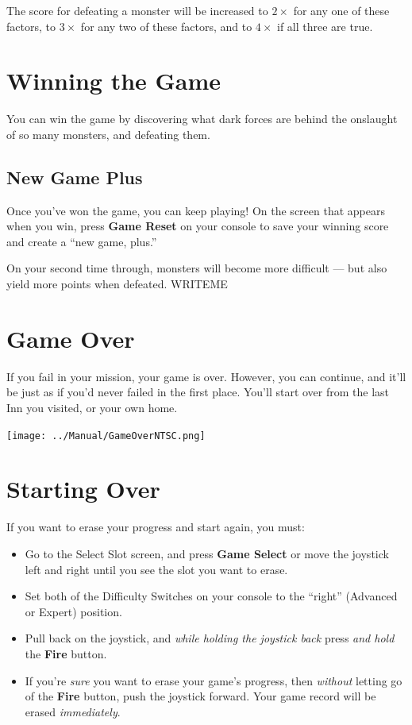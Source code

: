\documentclass[10pt,twocolumn,openany,article]{memoir}
\begin{document}
The score for  defeating a monster will be increased  to $2\times$ for any
one of these  factors, to $3\times$ for  any two of these  factors, and to
$4\times$ if all three are true.

\section{Winning the Game}

You can  win the  game by  discovering what dark  forces are  behind the
onslaught of so many monsters, and defeating them.

\subsection*{New Game Plus}\label{sec:NewGamePlus}

Once  you've won  the game,  you can  keep playing!  On the  screen that
appears when you win, press \textbf{Game  Reset} on your console to save
your winning score and create a ``new game, plus.''

On your second  time through, monsters will become more  difficult — but
also yield more points when defeated. WRITEME

\section{Game Over}

If  you fail  in  your mission,  your  game is  over.  However, you  can
continue, and it'll be just as if you'd never failed in the first place.
You'll start over from the last Inn you visited, or your own home.

\begin{center}
  \texttt{[image: ../Manual/GameOverNTSC.png]}
\end{center}

\section{Starting Over}\label{Starting Your Adventure Over}

If you want to erase your progress and start again, you must:

\begin{itemize}
\item Go  to the Select Slot  screen, and press \textbf{Game  Select} or
  move  the joystick  left and  right until  you see  the slot  you want
  to erase.
\item Set both  of the Difficulty Switches on your  console to the ``right''
  (Advanced or Expert) position.
\item Pull  back on the  joystick, and \emph{while holding  the joystick
    back} press \emph{and hold} the \textbf{Fire} button.
\item If you're \emph{sure} you want to erase your game's progress, then
  \emph{without}  letting  go  of  the \textbf{Fire}  button,  push  the
  joystick  forward. \ifdefined\DEMO  Your  game record  will be  erased
  \emph{immediately}. \fi
\end{itemize}
\end{document}
